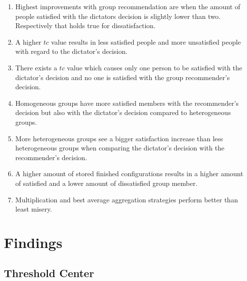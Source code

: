 \begin{enumerate}[font={\bfseries},label={H\arabic*}]
    \item \label{hyp:Evaluation:MaximumMinimum} Highest improvements with group recommendation are when the amount of people satisfied with the dictators decision is slightly lower than two. Respectively that holds true for dissatisfaction. 
    \item \label{hyp:Evaluation:HigherTcLessSatisfied} A higher $tc$ value results in less satisfied people and more unsatisfied people with regard to the dictator's decision.
    \item \label{hyp:Evaluation:OnlyOneSatisfied} There exists a $tc$ value which causes only one person to be satisfied with the dictator's decision and no one is satisfied with the group recommender's decision.
    \item \label{hyp:Evaluation:HomogenousMoreSatisfied} Homogeneous groups have more satisfied members with the recommender's decision but also with the dictator's decision compared to heterogeneous groups.
    \item \label{hyp:Evaluation:HeterogenousBiggerSatisfactionIncrease} More heterogeneous groups see a bigger satisfaction increase than less heterogeneous groups when comparing the dictator's decision with the recommender's decision.
    \item \label{hyp:Evaluation:StoreSizeBetterResults} A higher amount of stored finished configurations results in a higher amount of satisfied and a lower amount of dissatisfied group member.
    \item \label{hyp:Evaluation:AggregationStrategies} Multiplication and best average aggregation strategies perform better than least misery. %
\end{enumerate}


\section{Findings}
\label{sec:Evaluation:Findings}

\subsection{Threshold Center}

